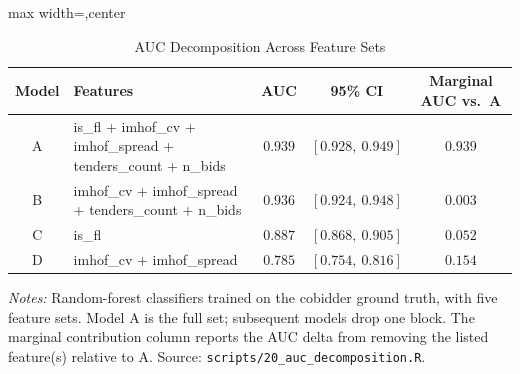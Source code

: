 \begin{table}[htbp]
\centering
\caption{AUC Decomposition Across Feature Sets}
\label{tab:auc_decomposition}
\begin{adjustbox}{max width=\textwidth,center}
\begin{threeparttable}
\footnotesize
\begin{tabular}{clccc}
\toprule
Model & Features & AUC & 95\% CI & Marginal AUC vs.\ A \\
\midrule
A & is\_fl + imhof\_cv + imhof\_spread + tenders\_count + n\_bids & $0.939$ & $[0.928,\ 0.949]$ & $0.939$ \\
B & imhof\_cv + imhof\_spread + tenders\_count + n\_bids & $0.936$ & $[0.924,\ 0.948]$ & $0.003$ \\
C & is\_fl & $0.887$ & $[0.868,\ 0.905]$ & $0.052$ \\
D & imhof\_cv + imhof\_spread & $0.785$ & $[0.754,\ 0.816]$ & $0.154$ \\
\bottomrule
\end{tabular}
\begin{tablenotes}
\footnotesize
\item \textit{Notes:} Random-forest classifiers trained on the cobidder ground truth, with five feature sets. Model A is the full set; subsequent models drop one block. The marginal contribution column reports the AUC delta from removing the listed feature(s) relative to A. Source: \texttt{scripts/20\_auc\_decomposition.R}.
\end{tablenotes}
\end{threeparttable}
\end{adjustbox}
\end{table}
